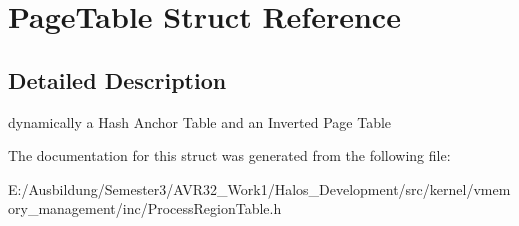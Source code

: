 \hypertarget{struct_page_table}{
\section{PageTable Struct Reference}
\label{struct_page_table}
}


\subsection{Detailed Description}
dynamically a Hash Anchor Table and an Inverted Page Table 

The documentation for this struct was generated from the following file:\begin{CompactItemize}
\item 
E:/Ausbildung/Semester3/AVR32\_\-Work1/Halos\_\-Development/src/kernel/vmemory\_\-management/inc/ProcessRegionTable.h\end{CompactItemize}

